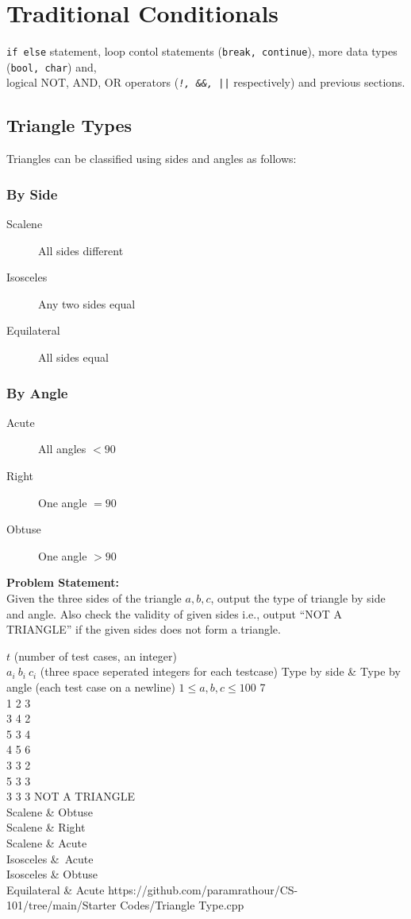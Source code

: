 \section{Traditional Conditionals}
\begin{topics}
\verb!if else! statement, loop contol statements (\verb!break, continue!), more data types (\verb!bool, char!) and, \\logical NOT, AND, OR operators (\emph{\texttt{!, \&\&, ||}} respectively) and previous sections.
\end{topics}
\subsection{Triangle Types}{\label{pp:triangletypes}}
Triangles can be classified using sides and angles as follows:
\subsubsection{By Side}
\begin{description}
\item[Scalene] All sides different
\item[Isosceles] Any two sides equal
\item[Equilateral] All sides equal
\end{description}
\subsubsection{By Angle}
\begin{description}
\item[Acute] All angles $< 90$\textdegree
\item[Right] One angle $= 90$\textdegree
\item[Obtuse] One angle $> 90$\textdegree
\end{description}
\textbf{Problem Statement:}\\
Given the three sides of the triangle $a,b,c$, output the type of triangle by side and angle. Also check the validity of given sides i.e., output ``NOT A TRIANGLE'' if the given sides does not form a triangle.
\begin{testcases}
	{$t$ \hfill(number of test cases, an integer)\\
	$a_{i}\ b_{i}\ c_{i}$ \hfill(three space seperated integers for each testcase)}
	{Type by side \& Type by angle \hfill{(each test case on a newline)}}
	{$1 \leq a,b,c \leq 100$}
	{7\\1 2 3\\3 4 2\\5 3 4\\4 5 6\\3 3 2\\5 3 3\\3 3 3}
	{NOT A TRIANGLE\\Scalene \& Obtuse\\Scalene \& Right\\Scalene \& Acute\\Isosceles \&\ Acute\\Isosceles \& Obtuse\\Equilateral \& Acute}
	{https://github.com/paramrathour/CS-101/tree/main/Starter Codes/Triangle Type.cpp}
\end{testcases}
